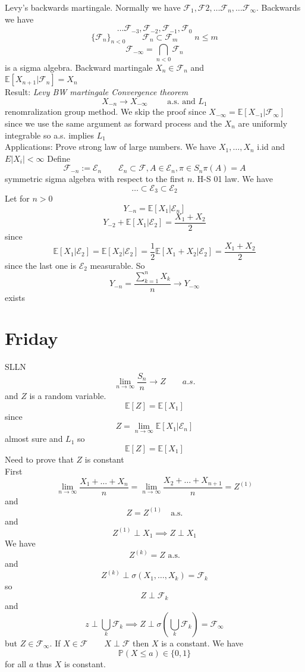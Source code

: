 \documentclass[11pt]{article}
\begin{document}
Levy's backwards martingale.
Normally we have $ \mathcal{F}_1, \mathcal{F}2,\dots \mathcal{F}_n, \dots \mathcal{F}_\infty$.
Backwards we have
\[
   \dots \mathcal{F}_{-3}, \mathcal{F}_{-2}, \mathcal{F}_{-1}, \mathcal{F}_0 
\] 
\[
    \{ \mathcal{F}_n\}_{n < 0} \qquad \mathcal{F}_n \subset \mathcal{F}_m \qquad n \le m
\] 
\[
    \mathcal{F}_{-\infty} = \bigcap_{n < 0} \mathcal{F}_n
\] 
is a sigma algebra.
Backward martingale $X_n \in \mathcal{F}_n$ and \\
$ \mathbb{E}[X_{n+1} | \mathcal{F}_n] = X_n$ \\
Result:
\emph{
    Levy BW martingale Convergence theorem\\
    \[
        X_{-n} \to X_{-\infty} \qquad \text{ a.s. and $L_1$}
    \] 
}
renomralization group method.
We skip the proof since $X_{-\infty} = \mathbb{E}[X_{-1} | \mathcal{F}_\infty]$ since we use 
the same argument as forward process and the $X_n$ are uniformly integrable so a.s. implies  $L_1$ \\
Applications:
Prove strong law of large numbers. We have $X_1,\dots,X_n$ i.id and $E |X_i| < \infty$
Define 
\[
    \mathcal{F}_{-n} := \mathcal{E}_n \qquad \mathcal{E}_n \subset \mathcal{F}, A \in \mathcal{E}_n, \pi \in S_n \pi(A) = A
\] 
symmetric sigma algebra with respect to the first $n$.
H-S 01 law.
We have
\[
\dots \subset \mathcal{E}_3 \subset \mathcal{E}_2
\] 
Let for $n > 0$
\[
    Y_{-n} = \mathbb{E}[X_1 | \mathcal{E}_n]
\] 
\[
    Y_{-2} + \mathbb{E}[X_1 | \mathcal{E}_2] = \frac{X_1 + X_2}{2}
\] 
since
\[
    \mathbb{E}[X_1 | \mathcal{E}_2] = \mathbb{E}[X_2 | \mathcal{E}_2] = \frac{1}{2} \mathbb{E}[X_1 + X_2 | \mathcal{E}_2]  = \frac{X_1 + X_2}{2}
\] 
since the last one is $ \mathcal{E}_2$ measurable.
So
\[
    Y_{-n} = \frac{\sum_{k=1}^{n}X_k}{n} \to Y_{-\infty} 
\] 
exists

\section{Friday}
SLLN
\[
\lim_{n\to \infty} \frac{S_n}{n} \to Z \qquad a.s.
\] 
and $Z$ is a random variable.
\[
    \mathbb{E}[Z] = \mathbb{E}[X_1]
\] 
since
\[
    Z = \lim_{n\to \infty } \mathbb{E}[X_1 |  \mathcal{E}_n] 
\] 
almost sure and $L_1$ so
\[
    \mathbb{E}[Z] = \mathbb{E}[X_1] 
\] 
Need to prove that $Z$ is constant\\
First 
\[
    \lim_{n\to \infty} \frac{X_1 + \dots + X_n}{n } = \lim_{n\to \infty} \frac{X_2 + \dots + X_{n+1}}{n} = Z^{(1)}
\] 
and 
\[
    Z = Z^{(1)} \quad \text{a.s.}
\]
and
\[
Z^{(1)} \perp X_1 \implies Z \perp X_1
\] 
We have
\[
    Z^{(k)} = Z \text{ a.s.}
\] 
and
\[
Z^{(k)} \perp \sigma(X_1,\dots,X_k) = \mathcal{F}_k
\] 
so
\[
Z \perp \mathcal{F}_k
\]
and
\[
z \perp \bigcup_{k} \mathcal{F}_k \implies Z \perp \sigma( \bigcup_{k} \mathcal{F}_k) = \mathcal{F}_\infty
\] 
but $Z \in \mathcal{F}_\infty$. If $X \in \mathcal{F} \qquad X \perp \mathcal{F}$ then $X$ is a constant.
We have
\[
    \mathbb{P}(X \le a) \in \{0,1\}
\] 
for all $a$ thus  $X$ is constant.\\
\end{document}
